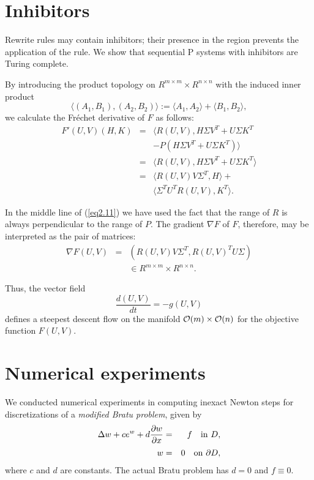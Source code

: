 \documentclass[myposter,portrait]{sciposter}
\def\mysection#1{
{\color{sectionCol}\section*{\sc\bfseries #1}}}
\begin{document}
\begin{multicols*}{3}
\mysection{Inhibitors}

Rewrite rules may contain inhibitors; their presence in the region prevents the application of the rule. We show that sequential P systems with inhibitors are Turing complete.


     By introducing the product topology on  $R^{m \times m} \times
R^{n \times n}$  with the induced inner product
\begin{equation}
\langle (A_{1},B_{1}), (A_{2},B_{2})\rangle := \langle A_{1},A_{2}\rangle 
+ \langle B_{1},B_{2}\rangle,\label{eq2.10}
\end{equation}
we calculate the Fr\'{e}chet derivative of  $F$  as follows:
\begin{eqnarray}
 F'(U,V)(H,K) &=& \langle R(U,V),H\Sigma V^{T} + U\Sigma K^{T}\nonumber\\
             && - P(H\Sigma V^{T} + U\Sigma K^{T})\rangle \nonumber \\
         &=& \langle R(U,V),H\Sigma V^{T} + U\Sigma K^{T}\rangle\nonumber \\
&=& \langle R(U,V)V\Sigma^{T},H\rangle + \nonumber\\
  &&    \langle \Sigma^{T}U^{T}R(U,V),K^{T}\rangle.    \label{eq2.11}
\end{eqnarray}

In the middle line of (\ref{eq2.11}) we have used the fact that the range of
$R$ is always perpendicular to the range of $P$.  The gradient $\nabla F$  of
$F$, therefore,  may be interpreted as the
pair of matrices:
\begin{eqnarray}
 \nabla F(U,V) &=& (R(U,V)V\Sigma^{T},R(U,V)^{T}U\Sigma )\nonumber\\
 && \in R^{m \times m} \times R^{n \times n}.   \label{eq2.12}
\end{eqnarray}

Thus, the vector field
\begin{equation}
\frac{d(U,V)}{dt} = -g(U,V) 	\label{eq2.15}
\end{equation}
defines a steepest descent flow on the manifold  ${\cal O} (m) \times
{\cal O} (n)$ for the objective function  $F(U,V)$.

\columnbreak 

\mysection{Numerical experiments} 

We conducted numerical experiments 
in computing inexact Newton steps for discretizations of a  
{\em modified Bratu problem}, given by  
\begin{eqnarray} 
{\displaystyle \Delta w + c e^w + d{ {\partial w}\over{\partial x} } } 
&=&{\displaystyle f \quad {\rm in}\ D, }\nonumber\\[-1.5ex]
\label{bratu} \\[-1.5ex]
{\displaystyle w }&=&{\displaystyle 0 \quad {\rm on}\ \partial D , } \nonumber
\end{eqnarray} 
where $c$ and $d$ are constants. The actual Bratu problem has $d=0$ and  
$f \equiv0$.


\end{multicols*}
\end{document}
